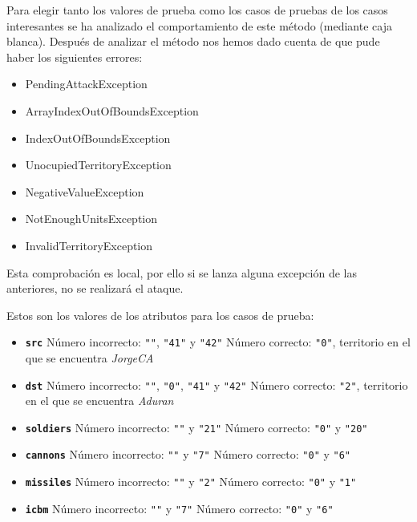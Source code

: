 Para elegir tanto los valores de prueba como los casos de pruebas de los casos interesantes se ha analizado el comportamiento de este método (mediante caja blanca). Después de analizar el método nos hemos dado cuenta de que pude haber los siguientes errores:
\begin{itemize}
\item PendingAttackException
\item ArrayIndexOutOfBoundsException
\item IndexOutOfBoundsException
\item UnocupiedTerritoryException
\item NegativeValueException
\item NotEnoughUnitsException
\item InvalidTerritoryException
\end{itemize}
Esta comprobación es local, por ello si se lanza alguna excepción de las anteriores, no se realizará el ataque.

Estos son los valores de los atributos para los casos de prueba:
\begin{itemize}
\item \textbf{\texttt{src}}
\subitem Número incorrecto: \texttt{""}, \texttt{"41"} y \texttt{"42"}
\subitem Número correcto: \texttt{"0"}, territorio en el que se encuentra \textit{JorgeCA}

\item \textbf{\texttt{dst}}
\subitem Número incorrecto: \texttt{""}, \texttt{"0"}, \texttt{"41"} y \texttt{"42"}
\subitem Número correcto: \texttt{"2"}, territorio en el que se encuentra \textit{Aduran}

\item \textbf{\texttt{soldiers}}
\subitem Número incorrecto: \texttt{""} y \texttt{"21"}
\subitem Número correcto: \texttt{"0"} y \texttt{"20"}

\item \textbf{\texttt{cannons}}
\subitem Número incorrecto: \texttt{""} y \texttt{"7"}
\subitem Número correcto: \texttt{"0"} y \texttt{"6"}

\item \textbf{\texttt{missiles}}
\subitem Número incorrecto: \texttt{""} y \texttt{"2"}
\subitem Número correcto: \texttt{"0"} y \texttt{"1"}

\item \textbf{\texttt{icbm}}
\subitem Número incorrecto: \texttt{""} y \texttt{"7"}
\subitem Número correcto: \texttt{"0"} y \texttt{"6"}
\end{itemize}

